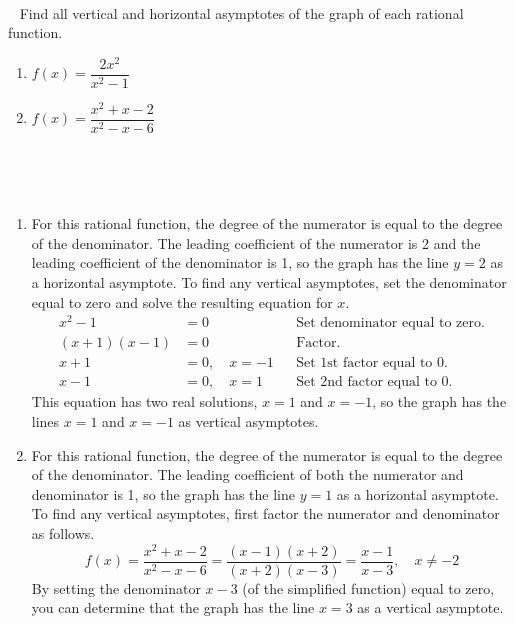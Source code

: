 ~\\
\begin{example}\cite{ci}~\newline
    Find all vertical and horizontal asymptotes of the graph of each rational function.
    \begin{enumerate}
        \item $f(x)=\dfrac{2x^2}{x^2-1}$
        \item $f(x)=\dfrac{x^2+x-2}{x^2-x-6}$
    \end{enumerate}
    ~\\
    \begin{solution}~\newline
        \begin{enumerate}
            \item For this rational function, the degree of the numerator is equal to the degree of the denominator. The leading coefficient of the numerator is 2 and the leading coefficient of the denominator is 1, so the graph has the line $y=2$ as a horizontal asymptote. To find any vertical asymptotes, set the denominator equal to zero and solve the resulting equation for $x$.
            \begin{align*}
                x^2-1 &=0       &&\text
                {Set denominator equal to zero.}\\
                (x+1)(x-1)&=0   &&\text
                {Factor.}\\
                x+1&=0,\quad x=-1    &&\text
                {Set 1st factor equal to 0.}\\
                x-1&=0,\quad x=1     &&\text
                {Set 2nd factor equal to 0.}
            \end{align*}
            This equation has two real solutions, $x=1$ and $x=-1$, so the graph has the lines $x=1$ and $x=-1$ as vertical asymptotes.

            \item For this rational function, the degree of the numerator is equal to the degree of the denominator. The leading coefficient of both the numerator and denominator is 1, so the graph has the line $y=1$ as a horizontal asymptote. To find any vertical asymptotes, first factor the numerator and denominator as follows.
            $$f(x)=\dfrac{x^2+x-2}{x^2-x-6}=\dfrac{(x-1)(x+2)}{(x+2)(x-3)}=\dfrac{x-1}{x-3},\quad x\neq -2$$
            By setting the denominator $x-3$ (of the simplified function) equal to zero, you can determine that the graph has the line $x=3$ as a vertical asymptote.
        \end{enumerate}
	\end{solution}
\end{example}

